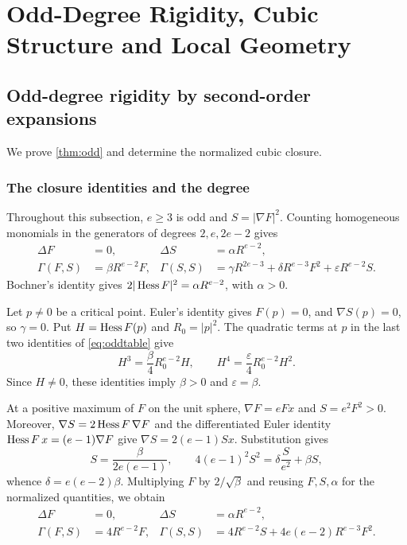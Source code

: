 \section[Odd-Degree Rigidity and Cubic Structure]{Odd-Degree Rigidity, Cubic Structure and Local Geometry}
\label{app:cubic-structure}

\subsection{Odd-degree rigidity by second-order expansions}
\label{sec:odd-rigidity-proof}
We prove \cref{thm:odd} and determine the normalized cubic closure.

\subsubsection{The closure identities and the degree}
Throughout this subsection, \(e\geq3\) is odd and
\(S=|\nabla F|^2\). Counting homogeneous monomials in the
generators of degrees \(2,e,2e-2\) gives
\begin{equation}\label{eq:oddtable}
\begin{aligned}
 \Delta F&=0,&\Delta S&=\alpha R^{e-2},\\
 \Gamma(F,S)&=\beta R^{e-2}F,&
 \Gamma(S,S)&=\gamma R^{2e-3}
       +\delta R^{e-3}F^2+\varepsilon R^{e-2}S.
\end{aligned}
\end{equation}
Bochner's identity gives \(2|\operatorname{Hess} F|^2=\alpha R^{e-2}\),
with \(\alpha>0\).

Let \(p\ne0\) be a critical point. Euler's identity gives
\(F(p)=0\), and \(\nabla S(p)=0\), so \(\gamma=0\).
Put \(H=\operatorname{Hess} F(p)\) and \(R_0=|p|^2\). The quadratic terms
at \(p\) in the last two identities of \eqref{eq:oddtable} give
\[
 H^3=\frac\beta4R_0^{e-2}H,\qquad
 H^4=\frac\varepsilon4R_0^{e-2}H^2.
\]
Since \(H\ne0\), these identities imply \(\beta>0\) and
\(\varepsilon=\beta\).

At a positive maximum of \(F\) on the unit sphere,
\(\nabla F=eFx\) and \(S=e^2F^2>0\). Moreover,
\(\nabla S=2\operatorname{Hess} F\,\nabla F\) and the differentiated Euler
identity \(\operatorname{Hess} F\,x=(e-1)\nabla F\) give
\(\nabla S=2(e-1)Sx\). Substitution gives
\[
 S=\frac{\beta}{2e(e-1)},\qquad
 4(e-1)^2S^2=\delta\frac{S}{e^2}+\beta S,
\]
whence \(\delta=e(e-2)\beta\). Multiplying \(F\) by
\(2/\sqrt\beta\) and reusing \(F,S,\alpha\) for the normalized
quantities, we obtain
\begin{equation}\label{eq:normalizedodd}
\begin{aligned}
 \Delta F&=0,&\Delta S&=\alpha R^{e-2},\\
 \Gamma(F,S)&=4R^{e-2}F,&
 \Gamma(S,S)&=4R^{e-2}S+4e(e-2)R^{e-3}F^2.
\end{aligned}
\end{equation}

